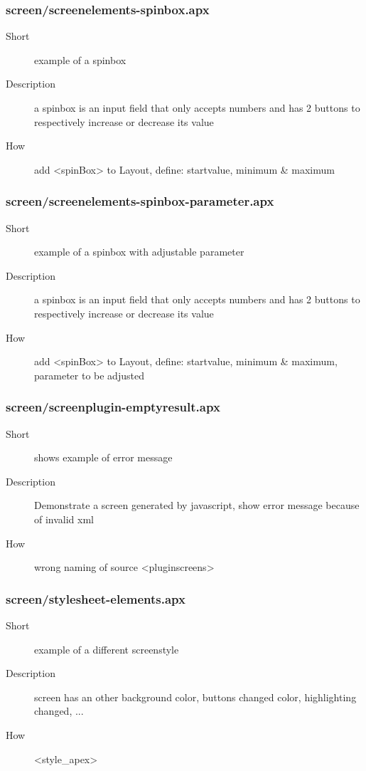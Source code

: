 \subsubsection{screen/screenelements-spinbox.apx}
\begin{description}
\item[Short] 
 example of a spinbox
\item[Description] 
 a spinbox is an input field that only accepts numbers and has 2 buttons to respectively increase or decrease its value
\item[How] 
 add \textless{}spinBox\textgreater{} to Layout, define: startvalue, minimum \& maximum
\end{description}

\subsubsection{screen/screenelements-spinbox-parameter.apx}
\begin{description}
\item[Short] 
 example of a spinbox with adjustable parameter
\item[Description] 
 a spinbox is an input field that only accepts numbers and has 2 buttons to respectively increase or decrease its value
\item[How] 
 add \textless{}spinBox\textgreater{} to Layout, define: startvalue, minimum \& maximum, parameter to be adjusted
\end{description}

\subsubsection{screen/screenplugin-emptyresult.apx}
\begin{description}
\item[Short] 
 shows example of error message
\item[Description] 
 Demonstrate a screen generated by javascript, show error message because of invalid xml
\item[How] 
 wrong naming of source \textless{}pluginscreens\textgreater{}
\end{description}

\subsubsection{screen/stylesheet-elements.apx}
\begin{description}
\item[Short] 
 example of a different screenstyle
\item[Description] 
 screen has an other background color, buttons changed color, highlighting changed, ...
\item[How] 
 \textless{}style\_apex\textgreater{}
\end{description}

